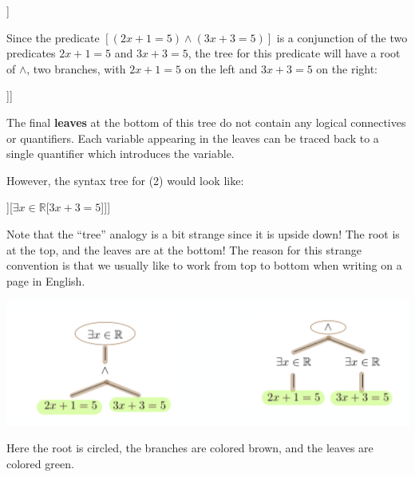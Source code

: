 \begin{center}
	\begin{forest}
		[\(\exists x \in \mathbb{R}\)[Tree for ``\({(2x+1 = 5) \wedge (3x+3 = 5)}\)'']]
	\end{forest}
\end{center}

Since the predicate $[(2x+1 = 5) \wedge (3x+3 = 5)]$ is a conjunction of the two predicates $2x+1 = 5$ and $3x+3 = 5$, the tree for this predicate will have a root of $\wedge$, two branches, with $2x+1 = 5$ on the left and $3x+3 = 5$ on the right:

\begin{center}
	\begin{forest}
		[\(\exists x \in \mathbb{R}\)[\(\wedge\)[\({2x+1 = 5}\)][\({3x+3 = 5}\)]]]
	\end{forest}
\end{center}

The  final \textbf{leaves} at the bottom of this tree do not contain any logical connectives or quantifiers.  Each variable appearing in the leaves can be traced back to a single quantifier which introduces the variable.

However, the syntax tree for (2) would look like:

\begin{center}
	\begin{forest}
		[\(\wedge\)[\(\exists x \in \mathbb{R}\)[\( {2x+1 = 5}\)]][\(\exists x \in \mathbb{R}\)[\( {3x+3 = 5}\)]]]
	\end{forest}
\end{center}

Note that the ``tree'' analogy is a bit strange since it is upside down!  The root is at the top, and the leaves are at the bottom!  The reason for this strange convention is that we usually like to work from top to bottom when writing on a page in English.

\includegraphics[scale = 0.4]{trees}

Here the root is circled, the branches are colored brown, and the leaves are colored green.


